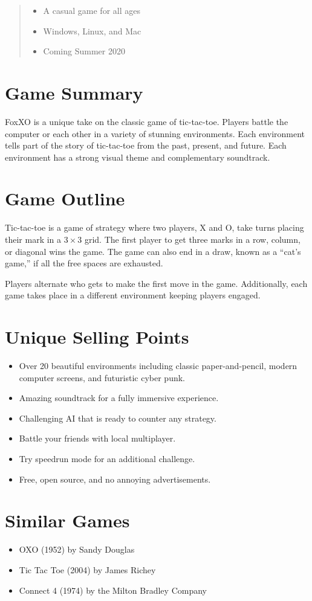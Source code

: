 \documentclass{tufte-handout}
\begin{document}
\begin{abstract}
  \begin{itemize}[noitemsep,label=]
    \item A casual game for all ages
    \item Windows, Linux, and Mac
    \item Coming Summer 2020
  \end{itemize}
\end{abstract}


\section{Game Summary}
FoxXO is a unique take on the classic game of tic-tac-toe. Players battle the
computer or each other in a variety of stunning environments. Each environment
tells part of the story of tic-tac-toe from the past, present, and future. Each
environment has a strong visual theme and complementary soundtrack.


\section{Game Outline}
Tic-tac-toe is a game of strategy where two players, X and O, take turns placing
their mark in a $3\times3$ grid. The first player to get three marks in a row,
column, or diagonal wins the game. The game can also end in a draw, known as a
``cat's game,'' if all the free spaces are exhausted.

Players alternate who gets to make the first move in the game. Additionally,
each game takes place in a different environment keeping players engaged.


\section{Unique Selling Points}
\begin{itemize}[noitemsep]
  \item {
    Over 20 beautiful environments including classic paper-and-pencil, modern
    computer screens, and futuristic cyber punk.
  }
  \item Amazing soundtrack for a fully immersive experience.
  \item Challenging AI that is ready to counter any strategy.
  \item Battle your friends with local multiplayer.
  \item Try speedrun mode for an additional challenge.
  \item Free, open source, and no annoying advertisements.
\end{itemize}


\section{Similar Games}
\begin{itemize}[noitemsep]
  \item OXO (1952) by Sandy Douglas
  \item Tic Tac Toe (2004) by James Richey
  \item Connect 4 (1974) by the Milton Bradley Company
\end{itemize}
\end{document}
